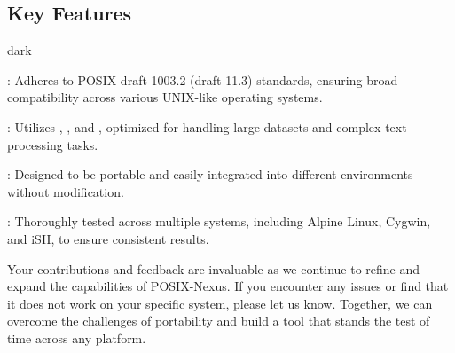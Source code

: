 \subsection{Key Features}
\label{sec:introduction:sub:feature}
\bigskip
\begin{baseBoxOne}{}{dark}
    \begin{posnexItemize}
        \item[\sA] : Adheres to POSIX draft 1003.2 (draft 11.3) standards, ensuring broad compatibility across various UNIX-like operating systems.
        \item[\sA] : Utilizes , , and , optimized for handling large datasets and complex text processing tasks.
        \item[\sA] : Designed to be portable and easily integrated into different environments without modification.
        \item[\sA] : Thoroughly tested across multiple systems, including Alpine Linux, Cygwin, and iSH, to ensure consistent results.
    \end{posnexItemize}
\end{baseBoxOne}
\bigskip
Your contributions and feedback are invaluable as we continue to refine and expand the capabilities of POSIX-Nexus.
If you encounter any issues or find that it does not work on your specific system, please let us know.
Together, we can overcome the challenges of portability and build a tool that stands the test of time across any platform.
